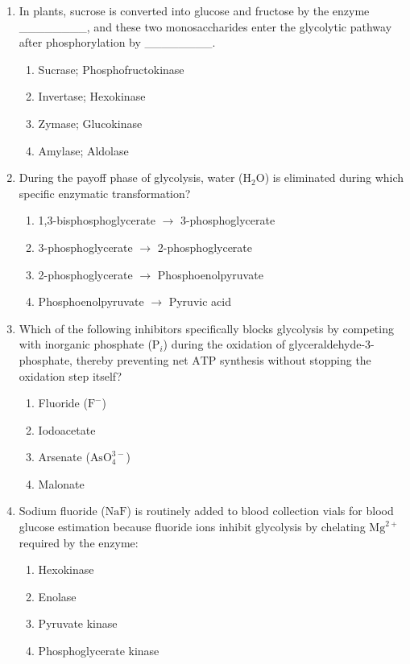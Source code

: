 \documentclass[11pt, a4paper]{article}
\begin{document}
\begin{enumerate}[label=\textbf{\arabic*.}]
\item In plants, sucrose is converted into glucose and fructose by the enzyme \_\_\_\_\_\_\_\_, and these two monosaccharides enter the glycolytic pathway after phosphorylation by \_\_\_\_\_\_\_\_.
\begin{enumerate}[label=(\Alph*)]
    \item Sucrase; Phosphofructokinase
    \item Invertase; Hexokinase
    \item Zymase; Glucokinase
    \item Amylase; Aldolase
\end{enumerate}

\item During the payoff phase of glycolysis, water ($\text{H}_2\text{O}$) is eliminated during which specific enzymatic transformation?
\begin{enumerate}[label=(\Alph*)]
    \item 1,3-bisphosphoglycerate $\rightarrow$ 3-phosphoglycerate
    \item 3-phosphoglycerate $\rightarrow$ 2-phosphoglycerate
    \item 2-phosphoglycerate $\rightarrow$ Phosphoenolpyruvate
    \item Phosphoenolpyruvate $\rightarrow$ Pyruvic acid
\end{enumerate}

\item Which of the following inhibitors specifically blocks glycolysis by competing with inorganic phosphate ($\text{P}_i$) during the oxidation of glyceraldehyde-3-phosphate, thereby preventing net $\text{ATP}$ synthesis without stopping the oxidation step itself?
\begin{enumerate}[label=(\Alph*)]
    \item Fluoride ($\text{F}^-$)
    \item Iodoacetate
    \item Arsenate ($\text{AsO}_4^{3-}$)
    \item Malonate
\end{enumerate}

\item Sodium fluoride ($\text{NaF}$) is routinely added to blood collection vials for blood glucose estimation because fluoride ions inhibit glycolysis by chelating $\text{Mg}^{2+}$ required by the enzyme:
\begin{enumerate}[label=(\Alph*)]
    \item Hexokinase
    \item Enolase
    \item Pyruvate kinase
    \item Phosphoglycerate kinase
\end{enumerate}


\end{enumerate}
\end{document}
